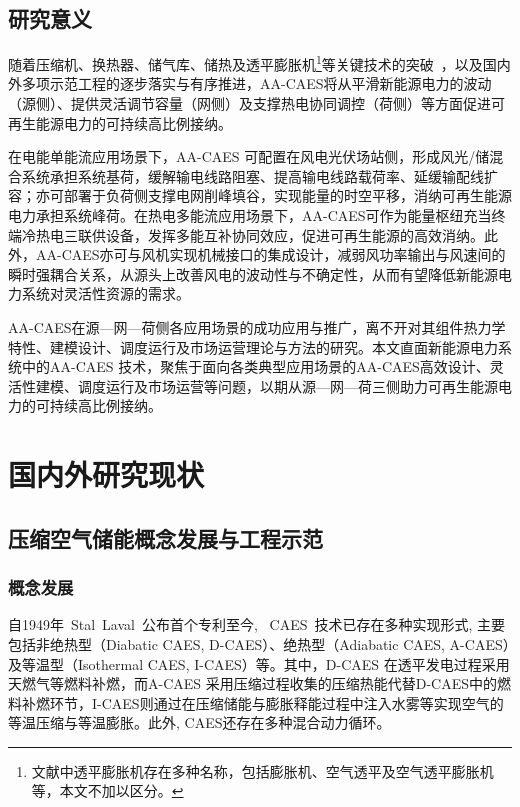 \subsection{研究意义}
随着压缩机、换热器、储气库、储热及透平膨胀机\footnote{文献中透平膨胀机存在多种名称，包括膨胀机、空气透平及空气透平膨胀机等，本文不加以区分。}等关键技术的突破~\cite{CAES-Review-17-Rui-salt,TES-CSP-review-13}，以及国内外多项示范工程的逐步落实与有序推进，AA-CAES将从平滑新能源电力的波动（源侧）、提供灵活调节容量（网侧）及支撑热电协同调控（荷侧）等方面促进可再生能源电力的可持续高比例接纳。

在电能单能流应用场景下，AA-CAES 可配置在风电光伏场站侧，形成风光/储混合系统承担系统基荷，缓解输电线路阻塞、提高输电线路载荷率、延缓输配线扩容；亦可部署于负荷侧支撑电网削峰填谷，实现能量的时空平移，消纳可再生能源电力承担系统峰荷\cite{CAES-Review-18-Rui-operation}。在热电多能流应用场景下，AA-CAES可作为能量枢纽充当终端冷热电三联供设备，发挥多能互补协同效应，促进可再生能源的高效消纳\cite{CAES-Review-18-Rui-operation}。此外，AA-CAES亦可与风机实现机械接口的集成设计，减弱风功率输出与风速间的瞬时强耦合关系，从源头上改善风电的波动性与不确定性，从而有望降低新能源电力系统对灵活性资源的需求。

AA-CAES在源—网—荷侧各应用场景的成功应用与推广，离不开对其组件热力学特性、建模设计、调度运行及市场运营理论与方法的研究。本文直面新能源电力系统中的AA-CAES 技术，聚焦于面向各类典型应用场景的AA-CAES高效设计、灵活性建模、调度运行及市场运营等问题，以期从源—网—荷三侧助力可再生能源电力的可持续高比例接纳。

\section{国内外研究现状}
\label{sec:research-state}
\subsection{压缩空气储能概念发展与工程示范}
\label{sec:research-state-engineer}

\subsubsection{概念发展}
自1949年~Stal~Laval~公布首个专利至今, ~CAES~技术已存在多种实现形式, 主要包括非绝热型（Diabatic CAES, D-CAES）、绝热型（Adiabatic CAES, A-CAES）及等温型（Isothermal CAES, I-CAES）等。其中，D-CAES 在透平发电过程采用天燃气等燃料补燃，而A-CAES 采用压缩过程收集的压缩热能代替D-CAES中的燃料补燃环节，I-CAES则通过在压缩储能与膨胀释能过程中注入水雾等实现空气的等温压缩与等温膨胀。此外, CAES还存在多种混合动力循环\cite{Thesis-Zhangjunliang,Thesis-Liuxiao}。

